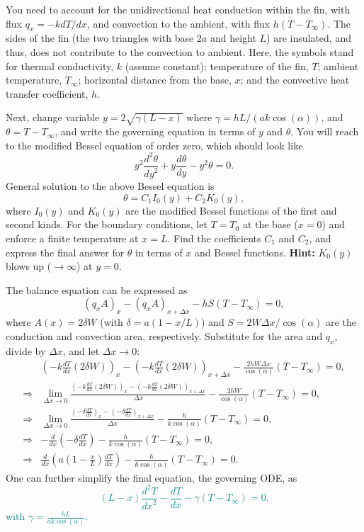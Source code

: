 \documentclass[12pt]{article}
\begin{document}
\begin{ex}
\begin{center}
\begin{tikzpicture}
    \end{tikzpicture}
  \end{center}
  
  You need to account for the unidirectional heat conduction within the fin, with flux $q_x=-kdT/dx$, and convection to the ambient, with flux $h(T-T_{\infty})$. The sides of the fin (the two triangles with base $2a$ and height $L$) are insulated, and thus, does not contribute to the convection to ambient. Here, the symbols stand for thermal conductivity, $k$ (assume constant); temperature of the fin, $T$; ambient temperature, $T_{\infty}$; horizontal distance from the base, $x$; and the convective heat transfer coefficient, $h$.
  
Next, change variable $y=2\sqrt{\gamma(L-x)}$ where $\gamma=hL/(ak\cos(\alpha))$, and $\theta=T-T_{\infty}$, and write the governing equation in terms of $y$ and $\theta$. You will reach to the modified Bessel equation of order zero, which should look like
  $$y^2\frac{d^2\theta}{{dy}^2}+y\frac{d\theta}{dy}-y^2\theta=0.$$
General solution to the above Bessel equation is
  $$\theta=C_1I_0(y)+C_2K_0(y),$$
  where $I_0(y)$ and $K_0(y)$ are the modified Bessel functions of the first and second kinds. For the boundary conditions, let $T=T_0$ at the base ($x=0$) and enforce a finite temperature at $x=L$. Find the coefficients $C_1$ and $C_2$, and express the final answer for $\theta$ in terms of $x$ and Bessel functions. \textbf{Hint: } $K_0(y)$ blows up ($\to\infty$) at $y=0$. 
  
\begin{solution}
  The balance equation can be expressed as
  $$\left(q_xA\right)_x-\left(q_xA\right)_{x+\Delta x}-hS(T-T_{\infty})=0,$$
  where $A(x)=2\delta W$ (with $\delta=a(1-x/L)$) and $S=2W\Delta x/\cos(\alpha)$ are the conduction and convection area, respectively. Substitute for the area and $q_x$, divide by $\Delta x$, and let $\Delta x\to 0$:
  \begin{align*}
    &\left(-k\frac{dT}{dx}(2\delta W)\right)_x-\left(-k\frac{dT}{dx}(2\delta W)\right)_{x+\Delta x}-\frac{2hW\Delta x}{\cos(\alpha)}(T-T_{\infty})=0,\\
    \Rightarrow&\lim_{\Delta x\to 0}\frac{\left(-k\frac{dT}{dx}(2\delta W)\right)_x-\left(-k\frac{dT}{dx}(2\delta W)\right)_{x+\Delta x}}{\Delta x}-\frac{2hW}{\cos(\alpha)}(T-T_{\infty})=0,\\
    \Rightarrow&\lim_{\Delta x\to 0}\frac{\left(-\delta\frac{dT}{dx}\right)_x-\left(-\delta\frac{dT}{dx}\right)_{x+\Delta x}}{\Delta x}-\frac{h}{k\cos(\alpha)}(T-T_{\infty})=0,\\
    \Rightarrow&-\frac{d}{dx}\left(-\delta \frac{dT}{dx}\right)-\frac{h}{k\cos(\alpha)}(T-T_{\infty})=0,\\
    \Rightarrow&\frac{d}{dx}\left(a\left(1-\frac{x}{L}\right)\frac{dT}{dx}\right)-\frac{h}{k\cos(\alpha)}(T-T_{\infty})=0.
  \end{align*}
  One can further simplify the final equation, the governing ODE, as
  \textcolor{teal}{$$(L-x)\frac{d^2T}{{dx}^2}-\frac{dT}{dx}-\gamma(T-T_{\infty})=0.$$
    with $\displaystyle{\gamma=\frac{hL}{ak\cos(\alpha)}}$.}


\end{solution}
\end{ex}
\end{document}
